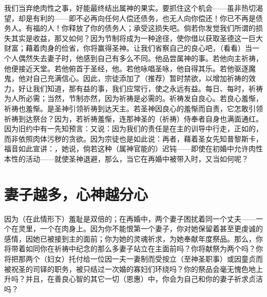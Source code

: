 我们当弃绝肉性之事，好能最终结出属神的果实。要抓住这个机会——虽非热切渴望，却是有利的——即不必再向任何人偿还债务，也无人向你偿还！你已不再是债务人。有福的人！你释放了你的债务人；承受这损失吧。倘若你发觉我们所谓的损失其实是收益，那又如何？因为节制将成为一种途径，使你借以获取圣德这一巨大财富；藉着肉身的俭省，你将赢得圣神。让我们省察自己的良心吧，（看看）当一个人偶然失去妻子时，他感到自己有多么不同。他品尝属神的事。若他向主祈祷，他便接近天堂。若他俯首于圣经，他。若他咏唱圣咏，他自得其乐。若他驱逐魔鬼，他对自己充满信心。因此，宗徒添加了（推荐）暂时禁欲，以增加祈祷的效力，好让我们知道，那有益的事，我们应常行，使之永远有益。每日、每时，祈祷为人所必需；当然，节制亦然，因为祈祷是必需的。祈祷发自良心。若良心羞惭，祈祷也羞惭。是圣神引领祈祷到达天主。若圣神因良心的羞惭而自责，它怎敢引领祈祷到达祭台？因为，若祈祷羞惭，连那神圣的（祈祷）侍奉者自身也满面通红。因为旧约中有一先知预言：又说：因为我们的责任是在主的训导中行走，正如的，而非依照肉体污秽的贪欲。因为宗徒也是如此说：再者，藉着圣女先知普黎斯卡，福音如此宣讲：，她说，倘若这种（属神官能的）迟钝——即使在初婚中允许肉性本性的活动——就使圣神退避，那么，当它在再婚中被带入时，又当如何呢？\par


\section{妻子越多，心神越分心}

因为（在此情形下）羞耻是双倍的；在再婚中，两个妻子困扰着同一个丈夫——一个在灵里，一个在肉身上。因为你不能恨第一个妻子，你对她保留着甚至更虔诚的感情，因她已被接到主的面前；你为她的灵魂祈求，为她奉献年度祭品。那么，你将带着如同你在祈祷中纪念的那么多妻子站立在主面前吗？你将献祭为两个吗？你将把那两个（妇女）托付给一位因一夫一妻制而受按立（至神圣职事）或因童贞而被祝圣的司铎的职务，被只结过一次婚的寡妇们环绕吗？你的祭品会毫无愧色地上升吗？并且，在善良心智的其它一切（恩惠）中，你会为自己和你的妻子祈求贞洁吗？\par


